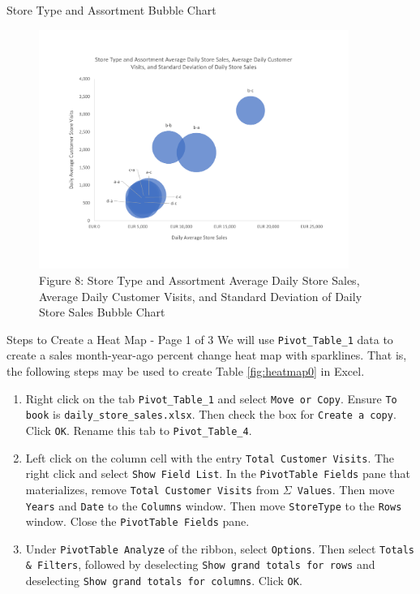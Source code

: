 \documentclass[pdf]{beamer}
\theoremstyle{remark}
\theoremstyle{definition}
\begin{document}
\begin{frame}[t]{Store Type and Assortment Bubble Chart}
\begin{figure}[htbp]
    \centering
    \captionsetup{justification=centering}
    \includegraphics[clip, trim=0cm 2.3cm 0cm 2.3cm, width=0.9\textwidth]{Bubble_Chart_Unit_3.pdf}  
    \caption{Figure {\color{franklinblue} 8}: Store Type and Assortment Average Daily Store Sales, Average Daily Customer Visits,  and Standard Deviation of Daily Store Sales Bubble Chart}
    \label{fig:bubblechart}
\end{figure}
\end{frame}

\begin{frame}[t]{Steps to Create a Heat Map - Page 1 of 3}
  We will use \texttt{Pivot\_Table\_1} data to create a sales month-year-ago percent change heat map with sparklines.  That is, the following steps may be used to create Table \ref{fig:heatmap0} in Excel.
\vspace{-0.5ex}
\small
\begin{enumerate}
\item Right click on the tab \texttt{Pivot\_Table\_1} and select \texttt{Move or Copy}.  Ensure \texttt{To book} is \texttt{daily\_store\_sales.xlsx}.  Then check the box for \texttt{Create a copy}. Click \texttt{OK}.  Rename this tab to \texttt{Pivot\_Table\_4}.
\item Left click on the column cell with the entry \texttt{Total Customer Visits}.  The right click and select \texttt{Show Field List}.  In the \texttt{PivotTable Fields} pane that materializes, remove \texttt{Total Customer Visits} from \texttt{$\Sigma$ Values}.  Then move \texttt{Years} and \texttt{Date} to the \texttt{Columns} window.  Then move \texttt{StoreType} to the \texttt{Rows} window.  Close the \texttt{PivotTable Fields} pane. 
\item Under \texttt{PivotTable Analyze} of the ribbon, select \texttt{Options}.  Then select \texttt{Totals \& Filters}, followed by deselecting \texttt{Show grand totals for rows} and deselecting \texttt{Show grand totals for columns}. Click \texttt{OK}.
\end{enumerate}
\end{frame}
\end{document}
